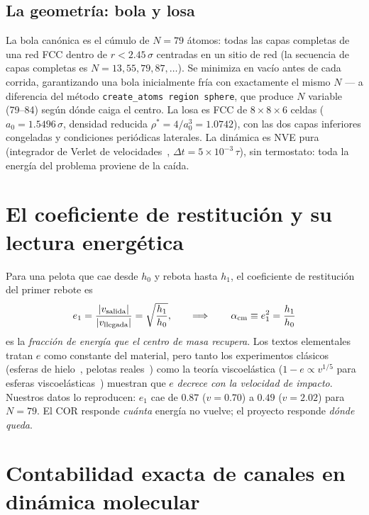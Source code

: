 \documentclass[11pt,a4paper]{article}
\begin{document}
\subsection{La geometría: bola y losa}
La bola canónica es el cúmulo de $N=79$ átomos: todas las capas completas de
una red FCC dentro de $r<2.45\,\sigma$ centradas en un sitio de red
(la secuencia de capas completas es $N = 13, 55, 79, 87, \ldots$). Se
minimiza en vacío antes de cada corrida, garantizando una bola inicialmente
fría con exactamente el mismo $N$ --- a diferencia del método
\texttt{create\_atoms region sphere}, que produce $N$ variable (79--84) según
dónde caiga el centro. La losa es FCC de $8\times8\times6$ celdas
($a_0 = 1.5496\,\sigma$, densidad reducida $\rho^* = 4/a_0^3 = 1.0742$),
con las dos capas inferiores congeladas y condiciones periódicas laterales.
La dinámica es NVE pura (integrador de Verlet de velocidades~\cite{Verlet1967},
$\Delta t = 5\times10^{-3}\,\tau$), sin termostato: toda la energía del
problema proviene de la caída.

\section{El coeficiente de restitución y su lectura energética}

Para una pelota que cae desde $h_0$ y rebota hasta $h_1$, el coeficiente de
restitución del primer rebote es
\begin{equation}
e_1 = \frac{|v_{\rm salida}|}{|v_{\rm llegada}|} = \sqrt{\frac{h_1}{h_0}},
\qquad\Longrightarrow\qquad
\alpha_{\rm cm} \equiv e_1^2 = \frac{h_1}{h_0}
\end{equation}
es la \emph{fracción de energía que el centro de masa recupera}. Los textos
elementales tratan $e$ como constante del material, pero tanto los
experimentos clásicos (esferas de hielo~\cite{Bridges1984}, pelotas
reales~\cite{Cross1999,Aguiar2003}) como la teoría viscoelástica
($1-e \propto v^{1/5}$ para esferas viscoelásticas~\cite{Ramirez1999})
muestran que $e$ \emph{decrece con la velocidad de impacto}. Nuestros datos
lo reproducen: $e_1$ cae de $0.87$ ($v=0.70$) a $0.49$ ($v=2.02$) para
$N=79$. El COR responde \emph{cuánta} energía no vuelve; el proyecto
responde \emph{dónde queda}.

\section{Contabilidad exacta de canales en dinámica molecular}
\label{sec:contabilidad}
\end{document}
